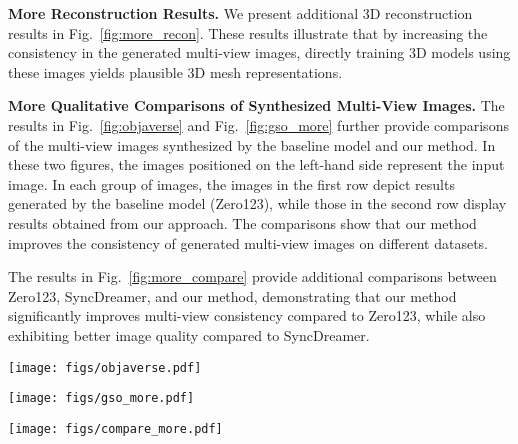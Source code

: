 \noindent\textbf{More Reconstruction Results.}
We present additional 3D reconstruction results in Fig.~\ref{fig:more_recon}. These results illustrate that by increasing the consistency in the generated multi-view images, directly training 3D models using these images yields plausible 3D mesh representations.

\noindent\textbf{More Qualitative Comparisons of Synthesized Multi-View Images.}
The results in Fig.~\ref{fig:objaverse} and Fig.~\ref{fig:gso_more} further provide comparisons of the multi-view images synthesized by the baseline model and our method.
In these two figures, the images positioned on the left-hand side represent the input image. In each group of images, the images in the first row depict results generated by the baseline model (Zero123), while those in the second row display results obtained from our approach.
The comparisons show that our method improves the consistency of generated multi-view images on different datasets.

The results in Fig.~\ref{fig:more_compare} provide additional comparisons between Zero123, SyncDreamer, and our method, demonstrating that our method significantly improves multi-view consistency compared to Zero123, while also exhibiting better image quality compared to SyncDreamer.

\begin{figure*}[t]
    \centering
    \texttt{[image: figs/objaverse.pdf]}
    \caption{Qualitative comparison with the baseline for generating a sequence of novel view images on the Objaverse dataset.
    The images positioned on the left-hand side represent the input image. In each group of images, the images in the first row depict results generated by the baseline model (Zero123), while those in the second row display results obtained from our approach. 
    The comparison demonstrates that our method can generate multi-view images with higher consistency.}
    \label{fig:objaverse}
\end{figure*}

\begin{figure*}[t]
    \centering
    \texttt{[image: figs/gso\_more.pdf]}
    \caption{More Qualitative comparison with the baseline for generating a sequence of novel view images on the GSO dataset.
    The image placement aligns with Fig.~\ref{fig:objaverse}.}
    \label{fig:gso_more}
\end{figure*}

\begin{figure*}[t]
    \centering
    \texttt{[image: figs/compare\_more.pdf]}
    \caption{More Qualitative comparison with Zero123 and SyncDreamer. The results show that our method significantly improves multi-view consistency compared to Zero123, while also exhibiting better image quality compared to SyncDreamer.}
    \label{fig:more_compare}
\end{figure*}

